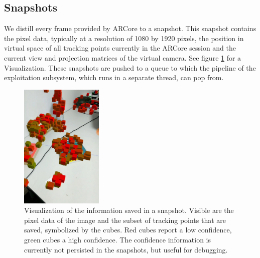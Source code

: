 \subsection{Snapshots}
We distill every frame provided by ARCore to a snapshot.
This snapshot contains the pixel data, typically at a resolution of 1080 by 1920 pixels, the position in virtual space of all tracking points currently in the ARCore session and the current view and projection matrices of the virtual camera. See figure \ref{fig:snapshot_data} for a Visualization.
These snapshots are pushed to a queue to which the pipeline of the exploitation subsystem, which runs in a separate thread, can pop from.

\begin{figure}
    \includegraphics[height=6cm]{graphics/snapshot-points.jpg}
    \caption{Visualization of the information saved in a snapshot. Visible are the pixel data of the image and the subset of tracking points that are saved, symbolized by the cubes. Red cubes report a low confidence, green cubes a high confidence. The confidence information is currently not persisted in the snapshots, but useful for debugging.}
    \label{fig:snapshot_data}
\end{figure}

